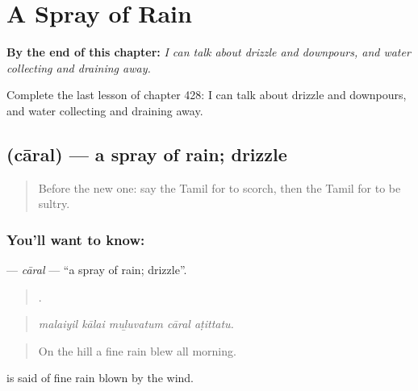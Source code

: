 
\chapter{A Spray of Rain}
\label{ch:ta-a-spray-of-rain}

\begin{chapteropening}
\textbf{By the end of this chapter:} \emph{I can talk about drizzle and downpours, and water collecting and draining away.}

Complete the last lesson of chapter 428: I can talk about drizzle and downpours, and water collecting and draining away.
\end{chapteropening}

\section[\texorpdfstring{\ta{சாரல்} (cāral)}{சாரல் (cāral)}]{ (cāral) — a spray of rain; drizzle}

\label{lesson:TA-C428-caral}



\begin{quote}
Before the new one: say the Tamil for to scorch, then the Tamil for to be sultry.
\end{quote}

\subsection*{You'll want to know: }
\textbf{} — \emph{cāral} — \textquotedblleft{}a spray of rain; drizzle\textquotedblright{}.

\begin{quote}
    .
\end{quote}

\begin{quote}
\emph{malaiyil kālai muḻuvatum cāral aṭittatu.}
\end{quote}

\begin{quote}
On the hill a fine rain blew all morning.
\end{quote}

  is said of fine rain blown by the wind.

